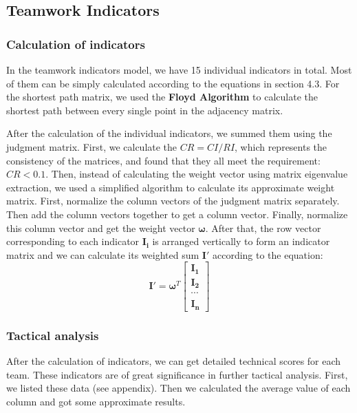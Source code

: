 \documentclass{mcmthesis}
\begin{document}
\subsection{Teamwork Indicators}
\subsubsection{Calculation of indicators}
In the teamwork indicators model, we have 15 individual indicators in total. Most of them can be simply calculated according to the equations in section 4.3. For the shortest path matrix, we used the \textbf{Floyd Algorithm} to calculate the shortest path between every single point in the adjacency matrix.\par
After the calculation of the individual indicators, we summed them using the judgment matrix. First, we calculate the $CR=CI/RI$, which represents the consistency of the matrices, and found that they all meet the requirement: $CR<0.1$. Then, instead of calculating the weight vector using matrix eigenvalue extraction, we used a simplified algorithm to calculate its approximate weight matrix. First, normalize the column vectors of the judgment matrix separately. Then add the column vectors together to get a column vector. Finally, normalize this column vector and get the weight vector $\boldsymbol{\omega}$. After that, the row vector corresponding to each indicator $\boldsymbol{I_i}$ is arranged vertically to form an indicator matrix and we can calculate its weighted sum $\boldsymbol{I'}$ according to the equation:
$$
\boldsymbol{I}'=\boldsymbol{\omega}^T\left[\begin{matrix}
		\boldsymbol{I_1} \\
		\boldsymbol{I_2} \\
		\cdots \\
		\boldsymbol{I_n}
\end{matrix}\right]
$$
\subsubsection{Tactical analysis}
After the calculation of indicators, we can get detailed technical scores for each team. These indicators are of great significance in further tactical analysis. First, we listed these data (see appendix). Then we calculated the average value of each column and got some approximate results.\par
\end{document}
